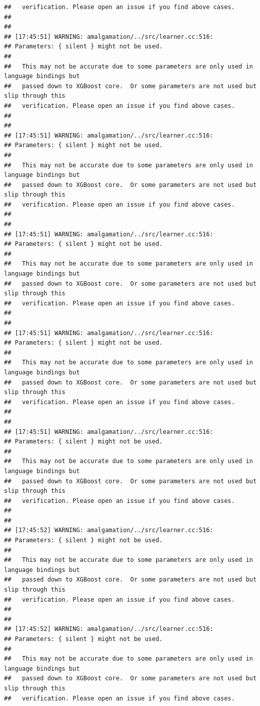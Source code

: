 \documentclass[AMS,STIX2COL]{WileyNJD-v2}\usepackage[]{graphicx}\usepackage[]{color}
\makeatletter
\newenvironment{kframe}{%
 \def\at@end@of@kframe{}%
 \ifinner\ifhmode%
  \def\at@end@of@kframe{\end{minipage}}%
  \begin{minipage}{\columnwidth}%
 \fi\fi%
 \def\FrameCommand##1{\hskip\@totalleftmargin \hskip-\fboxsep
 \colorbox{shadecolor}{##1}\hskip-\fboxsep
     \hskip-\linewidth \hskip-\@totalleftmargin \hskip\columnwidth}%
 \MakeFramed {\advance\hsize-\width
   \@totalleftmargin\z@ \linewidth\hsize
   \@setminipage}}%
 {\par\unskip\endMakeFramed%
 \at@end@of@kframe}
\newenvironment{knitrout}{}{} %
\makeatother
\begin{document}
\begin{knitrout}
\begin{kframe}
\begin{verbatim}
##   verification. Please open an issue if you find above cases.
## 
## 
## [17:45:51] WARNING: amalgamation/../src/learner.cc:516: 
## Parameters: { silent } might not be used.
## 
##   This may not be accurate due to some parameters are only used in language bindings but
##   passed down to XGBoost core.  Or some parameters are not used but slip through this
##   verification. Please open an issue if you find above cases.
## 
## 
## [17:45:51] WARNING: amalgamation/../src/learner.cc:516: 
## Parameters: { silent } might not be used.
## 
##   This may not be accurate due to some parameters are only used in language bindings but
##   passed down to XGBoost core.  Or some parameters are not used but slip through this
##   verification. Please open an issue if you find above cases.
## 
## 
## [17:45:51] WARNING: amalgamation/../src/learner.cc:516: 
## Parameters: { silent } might not be used.
## 
##   This may not be accurate due to some parameters are only used in language bindings but
##   passed down to XGBoost core.  Or some parameters are not used but slip through this
##   verification. Please open an issue if you find above cases.
## 
## 
## [17:45:51] WARNING: amalgamation/../src/learner.cc:516: 
## Parameters: { silent } might not be used.
## 
##   This may not be accurate due to some parameters are only used in language bindings but
##   passed down to XGBoost core.  Or some parameters are not used but slip through this
##   verification. Please open an issue if you find above cases.
## 
## 
## [17:45:51] WARNING: amalgamation/../src/learner.cc:516: 
## Parameters: { silent } might not be used.
## 
##   This may not be accurate due to some parameters are only used in language bindings but
##   passed down to XGBoost core.  Or some parameters are not used but slip through this
##   verification. Please open an issue if you find above cases.
## 
## 
## [17:45:52] WARNING: amalgamation/../src/learner.cc:516: 
## Parameters: { silent } might not be used.
## 
##   This may not be accurate due to some parameters are only used in language bindings but
##   passed down to XGBoost core.  Or some parameters are not used but slip through this
##   verification. Please open an issue if you find above cases.
## 
## 
## [17:45:52] WARNING: amalgamation/../src/learner.cc:516: 
## Parameters: { silent } might not be used.
## 
##   This may not be accurate due to some parameters are only used in language bindings but
##   passed down to XGBoost core.  Or some parameters are not used but slip through this
##   verification. Please open an issue if you find above cases.

\end{verbatim}
\end{kframe}
\end{knitrout}
\end{document}
